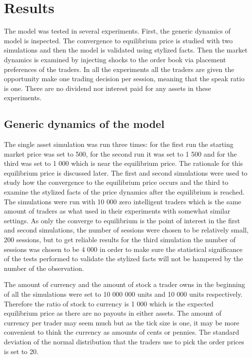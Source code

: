 
\section{Results}

The model was tested in several experiments. First, the generic dynamics of 
model is inspected. The convergence to equilibrium price is studied with two
simulations and then the model is validated using stylized facts. Then the
market dynamics is examined by injecting shocks to the order book via placement 
preferences of the traders. In all the experiments all the traders are given the 
opportunity make one trading decision per session, meaning that the speak ratio 
is one. There are no dividend nor interest paid for any assets in these experiments.

\subsection{Generic dynamics of the model}
The single asset simulation was run three times: for the first run
the starting market price was set to 500, for the second run it
was set to 1 500 and for the third was set to 1 000 which is near the equilibrium price. 
The rationale for this equilibrium price is discussed later.
The first and second simulations were
used to study how the convergence to the equilibrium price occurs
and the third to examine the stylized facts of the price
dynamics after the equilibrium is reached. The simulations were
run with 10 000 zero intelligent traders which is the 
same amount of traders as what \citet{Raberto05} used in their experiments
with somewhat similar settings. As only the converge to equilibrium is 
the point of interest in the first and second simulations, the number of sessions
were chosen to be relatively small, 200 sessions, but to get reliable results for
the third simulation the number of sessions was chosen to be 4 000 in order to 
make sure the statistical significance of the tests performed to validate the 
stylized facts will not be hampered by the number of the observation.

The amount of currency and the amount of stock 
a trader owns in the beginning of all the simulations were set to
10 000 000 units and 10 000 units respectively. Therefore
the ratio of stock to currency is 1 000 which
is the expected equilibrium price as there are
no payouts in either assets. The amount of currency
per trader may seem much but as the tick size is one,
it may be more convenient to think the currency as amounts
of cents or pennies. The standard deviation of
the normal distribution that the traders use to pick the order prices
is set to 20.

